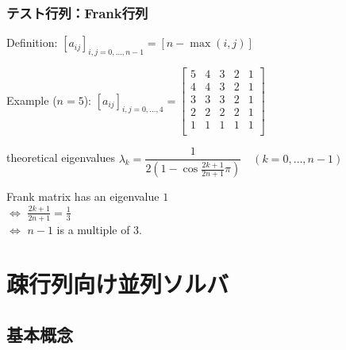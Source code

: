 \begin{frame}[c,fragile]
  \frametitle{テスト行列：Frank行列}
Definition: $[a_{ij}]_{i,j = {0, \dots, n-1}} = [ n - \max(i,j) ]$\\

\noindent
\begin{rei}%
Example ($n=5$): \quad
$[a_{ij}]_{i,j = {0, \dots, 4}} =
\begin{bmatrix}
5 & 4 & 3 & 2 & 1 \\
4 & 4 & 3 & 2 & 1 \\
3 & 3 & 3 & 2 & 1 \\
2 & 2 & 2 & 2 & 1 \\
1 & 1 & 1 & 1 & 1 \\
\end{bmatrix}
$
\end{rei}

\vspace{\baselineskip}
\noindent
\begin{rei}%
theoretical eigenvalues $\lambda_k = \dfrac{1}{2 \left( 1 - \cos{\tfrac{2 k + 1}{2 n + 1}\pi} \right)} \quad (k=0,\dots,n-1)$
\end{rei}%

\noindent
Frank matrix has an eigenvalue $1$\\
\quad $\Longleftrightarrow$ $\tfrac{2 k + 1}{2 n + 1} = \tfrac{1}{3}$\\
\quad $\Longleftrightarrow$ $n-1$ is a multiple of 3.

\end{frame}

\section{疎行列向け並列ソルバ}

\subsection{基本概念}

